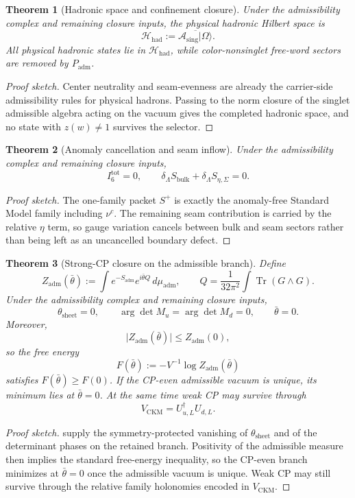\documentclass[11pt,a4paper]{article}
\newtheorem{theorem}{Theorem}[section]
\theoremstyle{definition}
\theoremstyle{remark}
\DeclareMathOperator{\tr}{Tr}
\newcommand{\Seam}{\Sigma}
\newcommand{\Asing}{\mathcal A_{\mathrm{sing}}}
\newcommand{\Hhad}{\mathcal H_{\mathrm{had}}}
\newcommand{\Padm}{P_{\mathrm{adm}}}
\begin{document}
\begin{theorem}[Hadronic space and confinement closure]
Under the admissibility complex and remaining closure inputs, the physical hadronic Hilbert space is
\[
\Hhad:=\overline{\Asing|\Omega\rangle}.
\]
All physical hadronic states lie in $\Hhad$, while color-nonsinglet free-word sectors are removed by $\Padm$.
\end{theorem}

\begin{proof}[Proof sketch]
Center neutrality and seam-evenness are already the carrier-side admissibility rules for physical hadrons. Passing to the norm closure of the singlet admissible algebra acting on the vacuum gives the completed hadronic space, and no state with $z(w)\neq 1$ survives the selector.
\end{proof}

\begin{theorem}[Anomaly cancellation and seam inflow]
Under the admissibility complex and remaining closure inputs,
\[
I_6^{\mathrm{tot}}=0,
\qquad
\delta_\Lambda S_{\mathrm{bulk}}+\delta_\Lambda S_{\eta,\Seam}=0.
\]
\end{theorem}

\begin{proof}[Proof sketch]
The one-family packet $S^+$ is exactly the anomaly-free Standard Model family including $\nu^c$. The remaining seam contribution is carried by the relative $\eta$ term, so gauge variation cancels between bulk and seam sectors rather than being left as an uncancelled boundary defect.
\end{proof}

\begin{theorem}[Strong-CP closure on the admissible branch]
\label{thm:strong-cp-closure}
Define
\[
Z_{\mathrm{adm}}(\bar\theta)
:=
\int e^{-S_{\mathrm{adm}}}e^{i\bar\theta Q}\,d\mu_{\mathrm{adm}},
\qquad
Q=\frac{1}{32\pi^2}\int \tr(G\wedge G).
\]
Under the admissibility complex and remaining closure inputs,
\[
\theta_{\mathrm{sheet}}=0,
\qquad
\arg\det M_u=\arg\det M_d=0,
\qquad
\bar\theta=0.
\]
Moreover,
\[
\bigl|Z_{\mathrm{adm}}(\bar\theta)\bigr|\le Z_{\mathrm{adm}}(0),
\]
so the free energy
\[
F(\bar\theta):=-V^{-1}\log Z_{\mathrm{adm}}(\bar\theta)
\]
satisfies $F(\bar\theta)\ge F(0)$. If the CP-even admissible vacuum is unique, its minimum lies at $\bar\theta=0$. At the same time weak CP may survive through
\[
V_{\mathrm{CKM}}=U_{u,L}^\dagger U_{d,L}.
\]
\end{theorem}

\begin{proof}[Proof sketch]
 supply the symmetry-protected vanishing of $\theta_{\mathrm{sheet}}$ and of the determinant phases on the retained branch. Positivity of the admissible measure then implies the standard free-energy inequality, so the CP-even branch minimizes at $\bar\theta=0$ once the admissible vacuum is unique. Weak CP may still survive through the relative family holonomies encoded in $V_{\mathrm{CKM}}$.
\end{proof}
\end{document}
